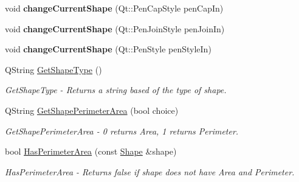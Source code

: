 \begin{DoxyCompactItemize}
void {\bfseries change\+Current\+Shape} (Qt\+::\+Pen\+Cap\+Style pen\+Cap\+In)
\item 
\mbox{\label{class_main_interface_a15666aefb9526f54640ca363cf2d3b0f}} 
void {\bfseries change\+Current\+Shape} (Qt\+::\+Pen\+Join\+Style pen\+Join\+In)
\item 
\mbox{\label{class_main_interface_a10a9313895f905135fdec689d34e7311}} 
void {\bfseries change\+Current\+Shape} (Qt\+::\+Pen\+Style pen\+Style\+In)
\item 
Q\+String \hyperlink{class_main_interface_a56a79641ec2a69ce589d01d22a26d41c}{Get\+Shape\+Type} ()
\begin{DoxyCompactList}\small\item\em Get\+Shape\+Type -\/ Returns a string based of the type of shape. \end{DoxyCompactList}\item 
Q\+String \hyperlink{class_main_interface_a4ccc1a9e32a7ad88caceb2acde07c565}{Get\+Shape\+Perimeter\+Area} (bool choice)
\begin{DoxyCompactList}\small\item\em Get\+Shape\+Perimeter\+Area -\/ 0 returns Area, 1 returns Perimeter. \end{DoxyCompactList}\item 
bool \hyperlink{class_main_interface_a5f424dd6f675ae1b55d39c60755cd464}{Has\+Perimeter\+Area} (const \hyperlink{class_shape}{Shape} \&shape)
\begin{DoxyCompactList}\small\item\em Has\+Perimeter\+Area -\/ Returns false if shape does not have Area and Perimeter. \end{DoxyCompactList}\end{DoxyCompactItemize}
